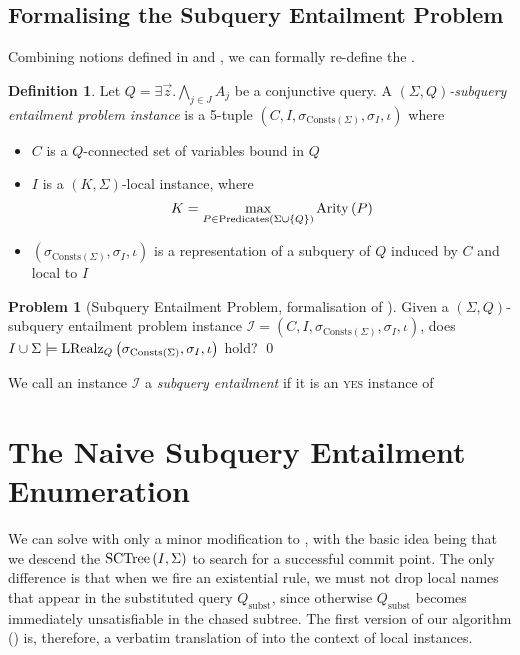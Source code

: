 \documentclass[12pt]{report}
\theoremstyle{plain}
\theoremstyle{definition}
\newtheorem{problem}[theorem]{Problem}
\newtheorem{definition}[theorem]{Definition}
\def\Consts{{\mathrm{Consts}}}
\def\Predicates{{\mathrm{Predicates}}}
\newcommand{\Arity}[1]{\ensuremath{\normalfont{\operatorname{Arity}} \left( #1 \right)}}
\newcommand{\SCTree}[2]{\ensuremath{\normalfont{\textrm{SCTree}} \left( #1, #2 \right)}}
\newcommand{\LRealz}[2]{\ensuremath{\normalfont{\textrm{LRealz}}_{ #1 } \left( #2 \right)}}
\begin{document}
\subsection{Formalising the Subquery Entailment Problem}

Combining notions defined in  and , we can formally re-define the .

\begin{definition}
  Let $Q = \exists \vec{z}. \bigwedge_{j \in J} A_j$ be a conjunctive query. A \emph{$(\Sigma, Q)$-subquery entailment problem instance} is a 5-tuple $(C, I, \sigma_{\Consts(\Sigma)}, \sigma_I, \iota)$ where
  \begin{itemize}
    \item $C$ is a $Q$-connected set of variables bound in $Q$
    \item $I$ is a $(K, \Sigma)$-local instance, where $$K = \max_{P \in \Predicates(\Sigma \cup \{Q\})} \Arity{P}$$
    \item $(\sigma_{\Consts(\Sigma)}, \sigma_I, \iota)$ is a representation of a subquery of $Q$ induced by $C$ and local to $I$
  \end{itemize}
\end{definition}

\begin{problem}[Subquery Entailment Problem, formalisation of ]
\label{subquery-entailment-problem}
  Given a $(\Sigma, Q)$-subquery entailment problem instance $\mathcal{I} = (C, I, \sigma_{\Consts(\Sigma)}, \sigma_I, \iota)$, does $I \cup \Sigma \models \LRealz{Q}{\sigma_{\Consts(\Sigma)}, \sigma_I, \iota}$ hold?
  \qed
\end{problem}

We call an instance $\mathcal{I}$ a \emph{subquery entailment} if it is an \textsc{yes} instance of 

\section{The Naive Subquery Entailment Enumeration}
\label{section:naive-subquery-entailment-enumeration}

We can solve  with only a minor modification to , with the basic idea being that we descend the $\SCTree{I}{\Sigma}$ to search for a successful commit point. The only difference is that when we fire an existential rule, we must not drop local names that appear in the substituted query $Q_\mathrm{subst}$, since otherwise $Q_\mathrm{subst}$ becomes immediately unsatisfiable in the chased subtree. The first version of our algorithm () is, therefore, a verbatim translation of  into the context of local instances.
\end{document}
